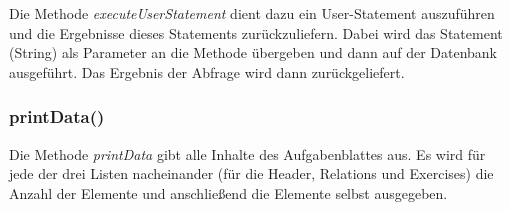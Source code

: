 \documentclass[11pt]{report}
\begin{document}
Die Methode \textit{executeUserStatement} dient dazu ein User-Statement auszuführen und die Ergebnisse dieses Statements zurückzuliefern.
Dabei wird das Statement (String) als Parameter an die Methode übergeben und dann auf der Datenbank ausgeführt. Das Ergebnis der Abfrage wird dann zurückgeliefert.

\subsubsection*{printData()}

Die Methode \textit{printData} gibt alle Inhalte des Aufgabenblattes aus.
Es wird für jede der drei Listen nacheinander (für die Header, Relations und Exercises) die Anzahl der Elemente und anschließend die Elemente selbst ausgegeben.
\end{document}
